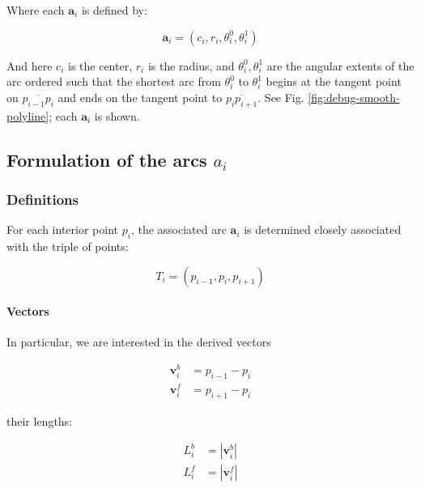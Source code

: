 \documentclass{article}
\begin{document}
Where each $\mathbf{a}_{i}$ is defined by:

\begin{equation}
  \label{eq:circ-def}
\mathbf{a}_i=\left(
  c_{i},
  r_{i},
  \theta^{0}_{i},
  \theta^{1}_{i}
\right)
\end{equation}

And here $c_{i}$ is the center, $r_{i}$ is the radius, and $\theta^{0}_{i}, \theta^{1}_{i}$ are the angular extents of the arc ordered such that the shortest arc from $\theta^0_i$ to $\theta^1_i$ begins at the tangent point on $\overline{p_{i-1}p_i}$ and ends on the tangent point to $\overline{p_ip_{i+1}}$.  See Fig. \ref{fig:debug-smooth-polyline}; each $\mathbf{a}_{i}$ is shown.

\subsection{Formulation of the arcs $a_{i}$}
\label{sec:formulation-arcs}
\subsubsection{Definitions}

For each interior point $p_{i}$, the associated arc $\mathbf{a}_{i}$ is determined closely associated with the triple of points:

\begin{equation}
  \label{eq:arc-triple}
  T_{i} = \left(p_{i-1}, p_{i}, p_{i+1}\right)
\end{equation}

\paragraph{Vectors}

In particular, we are interested in the derived vectors

\begin{align}
  \label{eq:vector-b}
  \mathbf{v}^{b}_{i} &= p_{i-1} - p_{i}\\
  \label{eq:vector-f}
  \mathbf{v}^{f}_{i} &= p_{i+1} - p_{i}
\end{align}

their lengths:

\begin{align}
  \label{eq:vector-length-b}
  L^{b}_{i} &= \left|\mathbf{v}^{b}_{i}\right|\\
  \label{eq:vector-length-f}
  L^{f}_{i} &= \left|\mathbf{v}^{f}_{i}\right|
\end{align}
\end{document}
